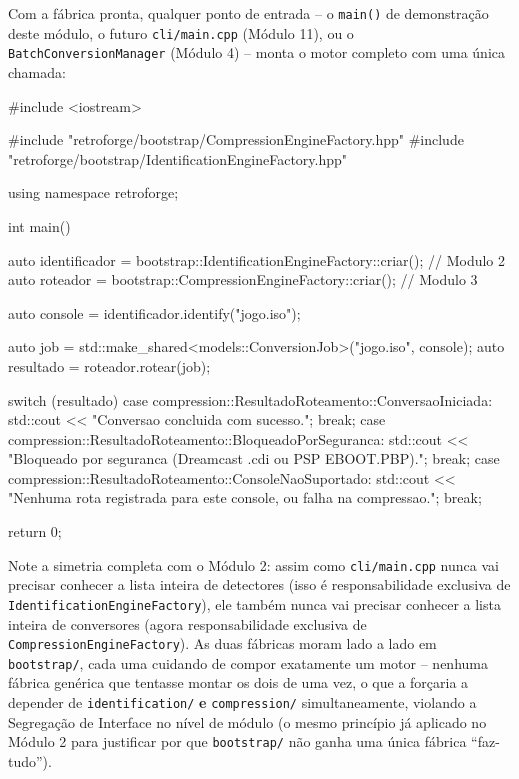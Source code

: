 Com a fábrica pronta, qualquer ponto de entrada -- o \texttt{main()} de demonstração deste módulo, o futuro \texttt{cli/main.cpp} (Módulo 11), ou o \texttt{BatchConversionManager} (Módulo 4) -- monta o motor completo com uma única chamada:

\begin{CaixaCodigo}
#include <iostream>

#include "retroforge/bootstrap/CompressionEngineFactory.hpp"
#include "retroforge/bootstrap/IdentificationEngineFactory.hpp"

using namespace retroforge;

int main() {
    auto identificador = bootstrap::IdentificationEngineFactory::criar(); // Modulo 2
    auto roteador = bootstrap::CompressionEngineFactory::criar();         // Modulo 3

    auto console = identificador.identify("jogo.iso");

    auto job = std::make_shared<models::ConversionJob>("jogo.iso", console);
    auto resultado = roteador.rotear(job);

    switch (resultado) {
        case compression::ResultadoRoteamento::ConversaoIniciada:
            std::cout << "Conversao concluida com sucesso.\n";
            break;
        case compression::ResultadoRoteamento::BloqueadoPorSeguranca:
            std::cout << "Bloqueado por seguranca (Dreamcast .cdi ou PSP EBOOT.PBP).\n";
            break;
        case compression::ResultadoRoteamento::ConsoleNaoSuportado:
            std::cout << "Nenhuma rota registrada para este console, ou falha na compressao.\n";
            break;
    }

    return 0;
}
\end{CaixaCodigo}

\begin{CaixaInfo}
Note a simetria completa com o Módulo 2: assim como \texttt{cli/main.cpp} nunca vai precisar conhecer a lista inteira de detectores (isso é responsabilidade exclusiva de \texttt{IdentificationEngineFactory}), ele também nunca vai precisar conhecer a lista inteira de conversores (agora responsabilidade exclusiva de \texttt{CompressionEngineFactory}). As duas fábricas moram lado a lado em \texttt{bootstrap/}, cada uma cuidando de compor exatamente um motor -- nenhuma fábrica genérica que tentasse montar os dois de uma vez, o que a forçaria a depender de \texttt{identification/} \textbf{e} \texttt{compression/} simultaneamente, violando a Segregação de Interface no nível de módulo (o mesmo princípio já aplicado no Módulo 2 para justificar por que \texttt{bootstrap/} não ganha uma única fábrica ``faz-tudo'').
\end{CaixaInfo}

